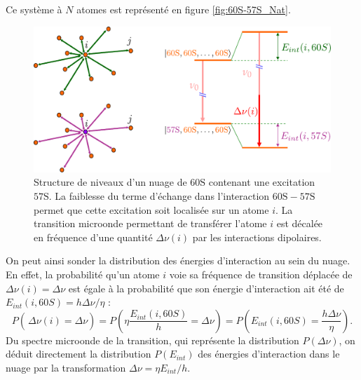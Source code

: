 Ce système à $N$ atomes est représenté en figure \eqref{fig:60S-57S_Nat}.
%
\begin{figure}[t]
\centering
\includegraphics[width=\linewidth]{figures/low_l/60S-57S_Nat}
\caption[Structure de niveaux d'un nuage de $\mathrm{60S}$ contenant une excitation $\mathrm{57S}$]{
Structure de niveaux d'un nuage de $\mathrm{60S}$ contenant une excitation $\mathrm{57S}$.
La faiblesse du terme d'échange dans l'interaction $\mathrm{60S-57S}$ permet que cette excitation soit localisée sur un atome $i$.
La transition microonde permettant de transférer l'atome $i$ est décalée en fréquence d'une quantité $\Delta\nu(i)$ par les interactions dipolaires.
}
\label{fig:60S-57S_Nat}
\end{figure}
%
On peut ainsi sonder la distribution des énergies d'interaction au sein du nuage.
En effet, la probabilité qu'un atome $i$ voie sa fréquence de transition déplacée de $\Delta\nu (i) = \Delta \nu$ est égale à la probabilité que son énergie d'interaction ait été de $E_{int}(i,60S) = h\Delta\nu/\eta$ :
\begin{equation}
P\left( \frac{}{} \!\Delta\nu(i)=\Delta\nu \right )
=P \left( \eta\frac{E_{int}(i,60S)}{h} = \Delta\nu \right) = P\left( E_{int}(i,60S) = \frac{h\Delta\nu}{\eta}%
\right).
\end{equation}
Du spectre microonde de la transition, qui représente la distribution $P(\Delta\nu)$, on déduit directement la distribution $P(E_{int})$ des énergies d'interaction dans le nuage par la transformation $\Delta\nu = \eta E_{int}/h$.

